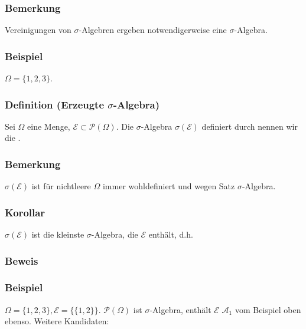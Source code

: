 \subsubsection{Bemerkung}
Vereinigungen von $\sigma$-Algebren ergeben  notwendigerweise eine $\sigma$-Algebra.
\subsubsection{Beispiel}
$\Omega=\{1,2,3\}$.
\subsubsection{Definition (Erzeugte $\sigma$-Algebra)}
Sei $\Omega$ eine Menge, $\mathcal{E}\subset\mathcal{P}(\Omega)$. Die $\sigma$-Algebra $\sigma(\mathcal{E})$ definiert durch
nennen wir die .
\subsubsection{Bemerkung}
$\sigma(\mathcal{E})$ ist f\"ur nichtleere $\Omega$ immer wohldefiniert und wegen Satz $\sigma$-Algebra.
\subsubsection{Korollar}
$\sigma(\mathcal{E})$ ist die kleinste $\sigma$-Algebra, die $\mathcal{E}$ enth\"alt, d.h.
\subsubsection{Beweis}
\subsubsection{Beispiel}
$\Omega=\{1,2,3\},\mathcal{E}=\{\{1,2\}\}$. $\mathcal{P}(\Omega)$ ist $\sigma$-Algebra, enth\"alt $\mathcal{E}$ $\mathcal{A}_1$ vom Beispiel oben ebenso. Weitere Kandidaten:

